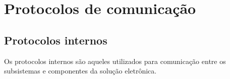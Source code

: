         
        
        
        

\section{Protocolos de comunicação}
\subsection{Protocolos internos}

Os protocolos internos são aqueles utilizados para comunicação entre os subsistemas e componentes da solução eletrônica.


